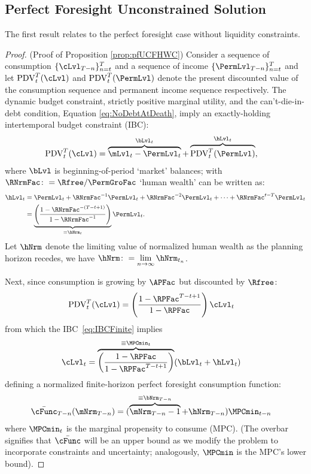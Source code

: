 \documentclass[\econtexRoot/BufferStockTheory]{subfiles}
\begin{document}
\subsection{Perfect Foresight Unconstrained Solution}\label{subsec:ApndxUCPF}

The first result relates to the perfect foresight case without liquidity constraints. 

\begin{proof}(Proof of Proposition \ref{prop:pfUCFHWC})
Consider a sequence of consumption $\{\cLvl_{T-n}\}_{n= t}^{T}$ and a sequence of income $\{\PermLvl_{T-n}\}_{n= t}^{T}$  and let $\mathrm{PDV}_{t}^{T}(\cLvl)$  and $\mathrm{PDV}_{t}^{T}(\PermLvl)$ denote the present discounted value of the consumption sequence and permanent income sequence respectively. The dynamic budget constraint, strictly positive marginal utility, and the can't-die-in-debt condition, Equation \eqref{eq:NoDebtAtDeath}, imply an exactly-holding intertemporal budget constraint (IBC):
%
%
\begin{align}
  \mathrm{PDV}_{t}^{T}(\cLvl)  & = \overbrace{\mLvl_{t}-\PermLvl_{t}}^{\bLvl_{t}}+\overbrace{\mathrm{PDV}_{t}^{T}(\PermLvl)}^{\hLvl_{t}}, \label{eq:IBCFinite}
\end{align} \hypertarget{FHWFacDefn}{}\hypertarget{PFRNrmDefn}{}
where $\bLvl$ is beginning-of-period `market' balances; with $\RNrmFac \colon = \Rfree/\PermGroFac$ `human wealth' can be written as:
%
% 
\begin{align}
  \hLvl_{t}  & = \PermLvl_{t}+\RNrmFac^{-1} \PermLvl_{t} + \RNrmFac^{-2} \PermLvl_{t} + \cdots + \RNrmFac^{t-T} \PermLvl_{t} \notag
  \\  & = \underbrace{\left(\frac{1-\RNrmFac^{-(T-t+1)}}{1-\RNrmFac^{-1}}\right)}_{\equiv \hNrm_{t}}\PermLvl_{t} \label{eq:HDef}.
\end{align}\hypertarget{FHWC}{}
%
%
Let $\hNrm$ denote the limiting value of normalized human wealth as the planning horizon recedes, we have  $\hNrm \colon = \lim\limits_{n \rightarrow \infty} \hNrm_{t_{n}}$.  

Next, since consumption is growing by $\APFac$ but discounted by $\Rfree$:
\begin{align*}
  \mathrm{PDV}_{t}^{T}(\cLvl)  & = \left(\frac{1-\RPFac^{T-t+1}}{1-\RPFac}\right)\cLvl_{t}
\end{align*}
from which the IBC~\eqref{eq:IBCFinite} implies
\begin{align}
  \cLvl_{t}  & = \overbrace{\left(\frac{1-\RPFac}{1-\RPFac^{T-t+1}}\right)}^{\equiv \MPCmin_{t}}
               (\bLvl_{t}+\hLvl_{t})   \label{eq:WDef}
\end{align}
defining a normalized finite-horizon perfect foresight consumption function:\hypertarget{MPCminDefn}{}
%
%
\begin{align*}
  \bar{\cFunc}_{T-n}(\mNrm_{T-n})  & = (\overbrace{\mNrm_{T-n}-1}^{
                                     \equiv\bNrm_{T-n}}+\hNrm_{T-n})\MPCmin_{t-n}
\end{align*}
%
%
where $\MPCmin_{t}$ is the marginal propensity to consume (MPC). (The overbar signifies that $\bar{\cFunc}$ will be an upper bound as we modify the problem to incorporate constraints and uncertainty; analogously, $\MPCmin$ is the MPC's lower bound). 


\end{proof}
\end{document}
